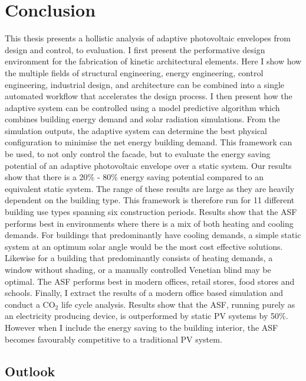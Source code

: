 
\chapter{Conclusion}
\label{ch:mainconclusion}


This thesis presents a hollistic analysis of adaptive photovoltaic envelopes from design and control, to evaluation. I first present the performative design environment for the fabrication of kinetic architectural elements. Here I show how the multiple fields of structural engineering, energy engineering, control engineering, industrial design, and architecture can be combined into a single automated workflow that accelerates the design process. I then present how the adaptive system can be controlled using a model predictive algorithm which combines building energy demand and solar radiation simulations. From the simulation outputs, the adaptive system can determine the best physical configuration to minimise the net energy building demand. This framework can be used, to not only control the facade, but to evaluate the energy saving potential of an adaptive photovoltaic envelope over a static system. Our results show that there is a 20\% - 80\% energy saving potential compared to an equivalent static system. The range of these results are large as they are heavily dependent on the building type. This framework is therefore run for 11 different building use types spanning six construction periods. Results show that the ASF performs best in environments where there is a mix of both heating and cooling demands. For buildings that predominantly have cooling demands, a simple static system at an optimum solar angle would be the most cost effective solutions. Likewise for a building that predominantly consists of heating demands, a window without shading, or a manually controlled Venetian blind may be optimal. The ASF performs best in modern offices, retail stores, food stores and schools. Finally, I extract the results of a modern office based simulation and conduct a CO$_2$ life cycle analysis. Results show that the ASF, running purely as an electricity producing device, is outperformed by static PV systems by 50\%. However when I include the energy saving to the building interior, the ASF becomes favourably competitive to a traditional PV system. 


\section{Outlook}
\label{ch:mainoutlook}

